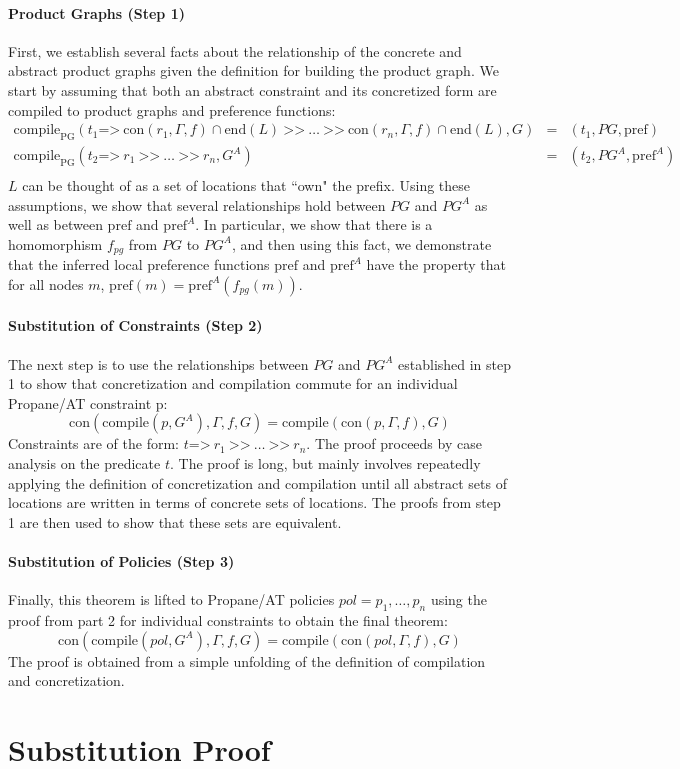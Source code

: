 \documentclass[twocolumn, openany]{sig-alternate-10pt}
\newcommand{\sysname}{{\small \sf Propane/AT}\xspace}
\newcommand{\para}[1]{\paragraph*{\textbf{#1}}}
\newcommand{\Prefer}{\texttt{>>}}
\newcommand{\Path}{\texttt{=>}}
\newcommand{\Con}{\mathrm{con}}
\newcommand{\CompilePg}{\ensuremath{\mathrm{compile}_\mathrm{PG}}}
\newcommand{\Compile}{\ensuremath{\mathrm{compile}}}
\newcommand{\Pref}{\ensuremath{\mathrm{pref}}}
\newcommand{\EndR}{\ensuremath{\mathrm{end}}}
\begin{document}
\para{Product Graphs (Step 1)} First, we establish several facts about the relationship of the concrete and abstract product graphs given the definition for building the product graph. We start by assuming that both an abstract constraint and its concretized form are compiled to product graphs and preference functions: 
%
\[
\begin{array}{lll}
  \CompilePg(t_1 \Path~ \Con(r_1,\Gamma,f) \cap \EndR(L) ~\Prefer~ \ldots ~\Prefer~ \Con(r_n,\Gamma,f) \cap \EndR(L), G) &=& (t_1, PG, \Pref) \\
  \CompilePg(t_2 \Path~ r_1 ~\Prefer~ \ldots ~\Prefer~ r_n, G^A) &=& (t_2, PG^A, \Pref^A) \\
\end{array}
\]
%
$L$ can be thought of as a set of locations that ``own" the prefix. Using these assumptions, we show that several relationships hold between $PG$ and $PG^A$ as well as between $\Pref$ and $\Pref^A$. In particular, we show that there is a homomorphism $f_{pg}$ from $PG$ to $PG^A$, and then using this fact, we demonstrate that the inferred local preference functions $\Pref$ and $\Pref^A$ have the property that for all nodes $m$,  $\Pref(m) = \Pref^A(f_{pg}(m))$.

\para{Substitution of Constraints (Step 2)} 
The next step is to use the relationships between $PG$ and $PG^A$ established in step 1 to show that concretization and compilation commute for an individual \sysname constraint p:
%
$$\Con(\Compile(p, G^A), \Gamma, f, G) = \Compile(\Con(p,\Gamma,f), G)$$
%
Constraints are of the form: $t \Path~ r_1 ~\Prefer~ \ldots ~\Prefer~ r_n$. The proof proceeds by case analysis on the predicate $t$. The proof is long, but mainly involves repeatedly applying the definition of concretization and compilation until all abstract sets of locations are written in terms of concrete sets of locations. The proofs from step 1 are then used to show that these sets are equivalent.

\para{Substitution of Policies (Step 3)} Finally, this theorem is lifted to \sysname policies $pol = p_1, \ldots, p_n$ using the proof from part 2 for individual constraints to obtain the final theorem:
%
$$\Con(\Compile(pol,G^A),\Gamma,f,G) = \Compile(\Con(pol,\Gamma,f), G)$$ 
%
The proof is obtained from a simple unfolding of the definition of compilation and concretization.

\newpage


\section{Substitution Proof}
\end{document}

